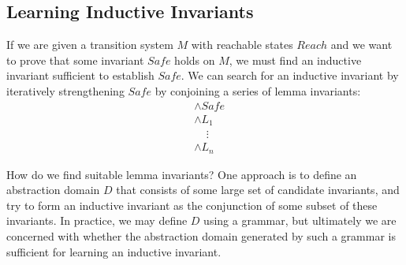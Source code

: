 \documentclass[10pt]{article}
\begin{document}
\subsection*{Learning Inductive Invariants}

If we are given a transition system $M$ with reachable states $Reach$ and we want to prove that some invariant $Safe$ holds on $M$, we must find an inductive invariant sufficient to establish $Safe$. We can search for an inductive invariant by iteratively strengthening $Safe$ by conjoining a series of lemma invariants:
\begin{align*}
    &\wedge Safe \\
    &\wedge L_1 \\
    &\phantom{\wedge}\vdots \\
    &\wedge L_n
\end{align*}

How do we find suitable lemma invariants? One approach is to define an abstraction domain $D$ that consists of some large set of candidate invariants, and try to form an inductive invariant as the conjunction of some subset of these invariants. In practice, we may define $D$ using a grammar, but ultimately we are concerned with whether the abstraction domain generated by such a grammar is sufficient for learning an inductive invariant.
\end{document}
